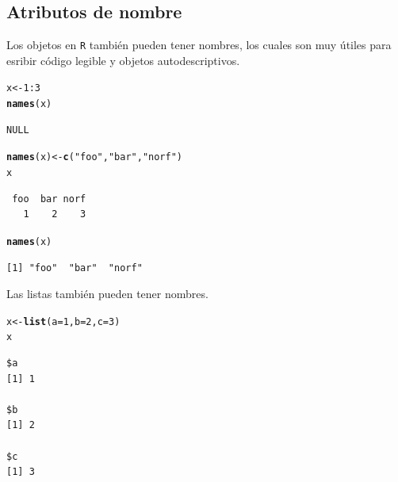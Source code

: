 \documentclass{article}\usepackage[]{graphicx}\usepackage[]{color}
\makeatletter
\newcommand{\hlnum}[1]{\textcolor[rgb]{0.686,0.059,0.569}{#1}}%
\newcommand{\hlstr}[1]{\textcolor[rgb]{0.192,0.494,0.8}{#1}}%
\newcommand{\hlopt}[1]{\textcolor[rgb]{0,0,0}{#1}}%
\newcommand{\hlstd}[1]{\textcolor[rgb]{0.345,0.345,0.345}{#1}}%
\newcommand{\hlkwb}[1]{\textcolor[rgb]{0.69,0.353,0.396}{#1}}%
\newcommand{\hlkwc}[1]{\textcolor[rgb]{0.333,0.667,0.333}{#1}}%
\newcommand{\hlkwd}[1]{\textcolor[rgb]{0.737,0.353,0.396}{\textbf{#1}}}%
\newenvironment{kframe}{%
 \def\at@end@of@kframe{}%
 \ifinner\ifhmode%
  \def\at@end@of@kframe{\end{minipage}}%
  \begin{minipage}{\columnwidth}%
 \fi\fi%
 \def\FrameCommand##1{\hskip\@totalleftmargin \hskip-\fboxsep
 \colorbox{shadecolor}{##1}\hskip-\fboxsep
     \hskip-\linewidth \hskip-\@totalleftmargin \hskip\columnwidth}%
 \MakeFramed {\advance\hsize-\width
   \@totalleftmargin\z@ \linewidth\hsize
   \@setminipage}}%
 {\par\unskip\endMakeFramed%
 \at@end@of@kframe}
\newenvironment{knitrout}{}{} %
\makeatother
\begin{document}
  \subsection{Atributos de nombre}
    Los objetos en \texttt{R} también pueden tener nombres, los cuales son muy útiles para esribir código legible y objetos autodescriptivos.
\begin{knitrout}
\color{fgcolor}\begin{kframe}
\begin{alltt}
  \hlstd{x} \hlkwb{<-} \hlnum{1}\hlopt{:}\hlnum{3}
  \hlkwd{names}\hlstd{(x)}
\end{alltt}
\begin{verbatim}
NULL
\end{verbatim}
\begin{alltt}
  \hlkwd{names}\hlstd{(x)} \hlkwb{<-} \hlkwd{c}\hlstd{(}\hlstr{"foo"}\hlstd{,} \hlstr{"bar"}\hlstd{,} \hlstr{"norf"}\hlstd{)}
  \hlstd{x}
\end{alltt}
\begin{verbatim}
 foo  bar norf 
   1    2    3 
\end{verbatim}
\begin{alltt}
  \hlkwd{names}\hlstd{(x)}
\end{alltt}
\begin{verbatim}
[1] "foo"  "bar"  "norf"
\end{verbatim}
\end{kframe}
\end{knitrout}

    Las listas también pueden tener nombres.
\begin{knitrout}
\color{fgcolor}\begin{kframe}
\begin{alltt}
  \hlstd{x} \hlkwb{<-} \hlkwd{list}\hlstd{(}\hlkwc{a} \hlstd{=} \hlnum{1}\hlstd{,} \hlkwc{b} \hlstd{=} \hlnum{2}\hlstd{,} \hlkwc{c} \hlstd{=} \hlnum{3}\hlstd{)}
  \hlstd{x}
\end{alltt}
\begin{verbatim}
$a
[1] 1

$b
[1] 2

$c
[1] 3
\end{verbatim}
\end{kframe}
\end{knitrout}
\end{document}
